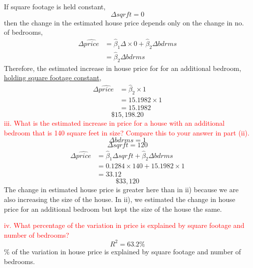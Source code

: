 \documentclass[12pt]{report}
\begin{document}
\noindent If square footage is held constant,
$$\Delta sqrft = 0$$
\noindent then the change in the estimated house price depends only on the change in no. of bedrooms,
\begin{align*}
\Delta\widehat{price} &= \hat{\beta}_1\Delta \times 0 + \hat{\beta}_2\Delta bdrms \\
&= \hat{\beta}_2\Delta bdrms
\end{align*}
\noindent Therefore, the estimated increase in house price for for an additional bedroom, \uline{holding square footage constant},
\begin{align*}
\Delta\widehat{price} &= \hat{\beta}_2 \times 1 \\
&= 15.1982 \times 1 \\
&= 15.1982
\end{align*}
$$\$15,198.20$$
\noindent \textcolor{red}
{
	iii. What is the estimated increase in price for a house with an additional bedroom that is 140 square feet in size? Compare this to your answer in part (ii).
}
$$\Delta bdrms = 1$$
$$\Delta sqrft = 120$$
\begin{align*}
\Delta\widehat{price} &= \hat{\beta}_1\Delta sqrft + \hat{\beta}_2\Delta bdrms \\
&= 0.1284 \times 140+15.1982 \times 1 \\
&= 33.12
\end{align*}
$$\$33,120$$
\noindent The change in estimated house price is greater here than in ii) because we are also increasing the size of the house. In ii), we estimated the change in house price for an additional bedroom but kept the size of the house the same.

\noindent \textcolor{red}
{
	iv. What percentage of the variation in price is explained by square footage and number of bedrooms?
}
$$R^2 = 63.2\%$$
\% of the variation in house price is explained by square footage and number of bedrooms.
\end{document}
